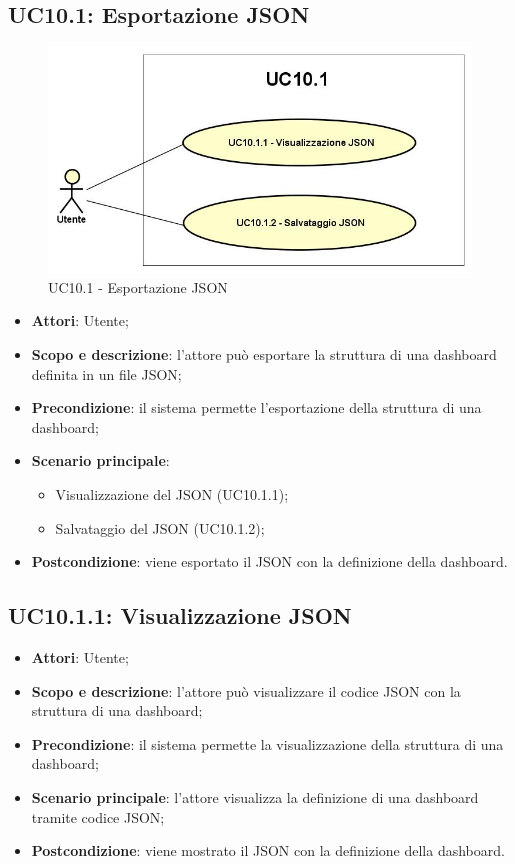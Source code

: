 \subsection{UC10.1: Esportazione JSON}
\hypertarget{UC10.1}{}
\begin{figure} [H]
	\centering
	\includegraphics[scale=0.5]{Img/UC10-1}
	\caption{UC10.1 - Esportazione JSON}\label{}
\end{figure}
\begin{itemize}
	\item \textbf{Attori}: Utente;
	\item \textbf{Scopo e descrizione}: l'attore può esportare la struttura di una dashboard definita in un file JSON;
	\item \textbf{Precondizione}: il sistema permette l'esportazione della struttura di una dashboard;
	\item \textbf{Scenario principale}: 
	\begin{itemize}
		\item Visualizzazione del JSON (UC10.1.1);
		\item Salvataggio del JSON (UC10.1.2);
	\end{itemize}
	\item \textbf{Postcondizione}: viene esportato il JSON con la definizione della dashboard.
\end{itemize}

\subsection{UC10.1.1: Visualizzazione JSON}
\hypertarget{UC10.1.1}{}
\begin{itemize}
	\item \textbf{Attori}: Utente;
	\item \textbf{Scopo e descrizione}: l'attore può visualizzare il codice JSON con la struttura di una dashboard;
	\item \textbf{Precondizione}: il sistema permette la visualizzazione della struttura di una dashboard;
	\item \textbf{Scenario principale}: l'attore visualizza la definizione di una dashboard tramite codice JSON;
	\item \textbf{Postcondizione}: viene mostrato il JSON con la definizione della dashboard.
\end{itemize}

